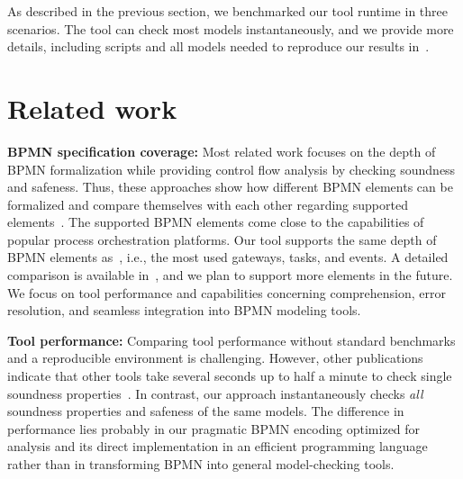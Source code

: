 \documentclass[
twocolumn
]{ceurart}
\begin{document}
As described in the previous section, we benchmarked our tool runtime in three scenarios.
The tool can check most models instantaneously, and we provide more details, including scripts and all models needed to reproduce our results in~\cite{krauterInstantaneousComprehensibleFixable2024}.

\section{Related work} \label{sec:related-work}

\textbf{BPMN specification coverage:}
Most related work focuses on the depth of BPMN formalization while providing control flow analysis by checking soundness and safeness.
Thus, these approaches show how different BPMN elements can be formalized and compare themselves with each other regarding supported elements~\cite{corradiniFormalApproachAnalysis2021,houhouFirstOrderLogicVerification2022,krauterFormalizationAnalysisBPMN2023,krauterHigherorderTransformationApproach2024}.
The supported BPMN elements come close to the capabilities of popular process orchestration platforms.
Our tool supports the same depth of BPMN elements as~\cite{corradiniFormalApproachAnalysis2021}, i.e., the most used gateways, tasks, and events.
A detailed comparison is available in~\cite{timkrauterBPM2024Artifacts2024}, and we plan to support more elements in the future.
We focus on tool performance and capabilities concerning comprehension, error resolution, and seamless integration into BPMN modeling tools.

\textbf{Tool performance:}
Comparing tool performance without standard benchmarks and a reproducible environment is challenging.
However, other publications indicate that other tools take several seconds up to half a minute to check single soundness properties~\cite{corradiniFormalApproachAnalysis2021,houhouFirstOrderLogicVerification2022,krauterHigherorderTransformationApproach2024}.
In contrast, our approach instantaneously checks \textit{all} soundness properties and safeness of the same models.
The difference in performance lies probably in our pragmatic BPMN encoding optimized for analysis and its direct implementation in an efficient programming language rather than in transforming BPMN into general model-checking tools.
\end{document}

